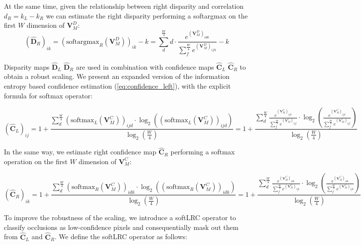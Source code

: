 \documentclass[10pt,twocolumn,letterpaper]{article}
\begin{document}
At the same time, given the relationship between right disparity and correlation $d_R=k_L-k_R$ we can estimate the right disparity performing a softargmax on the first $W$ dimension of $\mathbf{V}^D_M$:
\small\begin{equation}
    (\hat{\mathbf{D}}_R)_{ik} = \left(\text{softargmax}_R(\mathbf{V}^D_M)\right)_{ik} - k = \sum_{d}^{\frac{W}{4}} d \cdot \frac{e^{(\mathbf{V}^D_M)_{idk}}}{\sum_{f}^{\frac{W}{4}} e^{(\mathbf{V}^D_M)_{ifk}}} - k
    \label{eq:softmax_right}
\end{equation}\normalsize

Disparity maps $\hat{\mathbf{D}}_L$ $\hat{\mathbf{D}}_R$ are used in combination with confidence maps $\hat{\mathbf{C}}_L$ $\hat{\mathbf{C}}_R$ to obtain a robust scaling.
We present an expanded version of the information entropy based confidence estimation (\cref{eq:confidence_left}), with the explicit formula for softmax operator:

\small\begin{equation}
    (\hat{\mathbf{C}}_L)_{ij} = 1  + \frac{\sum_{d}^{\frac{W}{4}} \left(\text{softmax}_L(\mathbf{V}_M^C)\right)_{ijd} \cdot \log_2 \left( \left(\text{softmax}_L(\mathbf{V}_M^C)\right)_{ijd} \right)}{\log_2(\frac{W}{4})} = 1  + \frac{\sum_{d}^{\frac{W}{4}} \frac{e^{(\mathbf{V}^C_M)_{ijd}}}{\sum_{f}^{\frac{W}{4}} e^{(\mathbf{V}^C_M)_{ijf}}} \cdot \log_2 \left( \frac{e^{(\mathbf{V}^C_M)_{ijd}}}{\sum_{f}^{\frac{W}{4}} e^{(\mathbf{V}^C_M)_{ijf}}} \right)}{\log_2(\frac{W}{4})}
    \label{eq:confidence_left2}
\end{equation}\normalsize

In the same way, we estimate right confidence map $\hat{\mathbf{C}}_R$ performing a softmax operation on the first $W$ dimension of $\mathbf{V}^C_M$:

\small\begin{equation}
    (\hat{\mathbf{C}}_R)_{ik} = 1  + \frac{\sum_{d}^{\frac{W}{4}} \left(\text{softmax}_R(\mathbf{V}_M^C)\right)_{idk} \cdot \log_2 \left( \left(\text{softmax}_R(\mathbf{V}_M^C)\right)_{idk} \right)}{\log_2(\frac{W}{4})} = 1 + \frac{\sum_{d}^{\frac{W}{4}} \frac{e^{(\mathbf{V}^C_M)_{idk}}}{\sum_{f}^{\frac{W}{4}} e^{(\mathbf{V}^C_M)_{ifk}}} \cdot \log_2 \left( \frac{e^{(\mathbf{V}^C_M)_{idk}}}{\sum_{f}^{\frac{W}{4}} e^{(\mathbf{V}^C_M)_{ifk}}} \right)}{\log_2(\frac{W}{4})}
    \label{eq:confidence_right}
\end{equation}\normalsize

To improve the robustness of the scaling, we introduce a softLRC operator to classify occlusions as low-confidence pixels and consequentially mask out them from $\hat{\mathbf{C}}_L$ and $\hat{\mathbf{C}}_R$.
We define the softLRC operator as follows:
\end{document}
